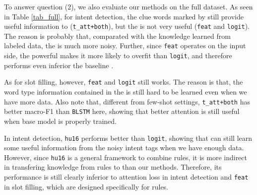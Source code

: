 To answer question (2), we also evaluate our methods on the full dataset.
As seen in Table \ref{tab_full}, for intent detection,
the clue words marked by \RE still provide useful information to \NN (\texttt{t\_att+both}),
but the \REtag is not very useful (\texttt{feat} and \texttt{logit}).
The reason is probably that, comparated with the knowledge learned from labeled data, the \REtag is much more noisy.
Further, since \texttt{feat} operates on the input side, the powerful \NN makes it more likely to overfit than \texttt{logit}, and therefore performs even inferior the baseline \BLSTM.

As for slot filling, however, \texttt{feat} and \texttt{logit} still works.
The reason is that, the word type information contained in the \REtag is still hard to be learned even when we have more data.
Also note that, different from few-shot settings, \texttt{t\_att+both} has better macro-F1 than \texttt{BLSTM} here, showing that better attention is still useful when base model is properly trained.

In intent detection, \texttt{hu16} performs better than \texttt{logit}, showing that \NN can still learn some useful information from the noisy intent \RE tags when we have enough data.
However, since \texttt{hu16} is a general framework to combine \FOL rules, it is more indirect in transfering knowledge from rules to \NN than our methods. Therefore, its performance is still clearly inferior to attention loss in intent detection and \texttt{feat} in slot filling, which are designed specifically for \RE rules.

